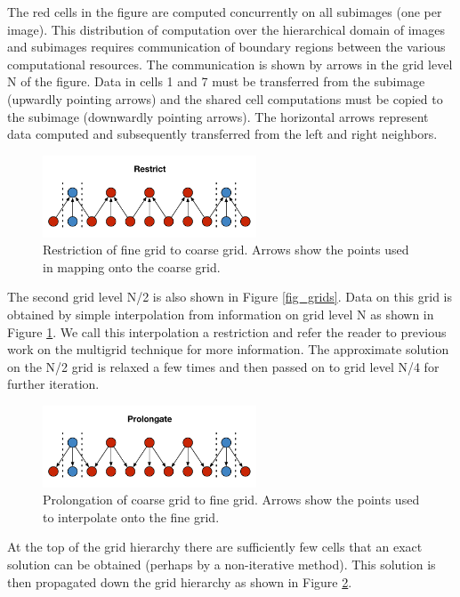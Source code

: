 The red cells in the figure are computed concurrently on all subimages (one per image).
This distribution of computation over the hierarchical domain of images and subimages
requires communication of boundary regions between the various computational resources.
The communication is shown by arrows in the grid level N of the figure.  Data in cells 1
and 7 must be transferred from the subimage (upwardly pointing arrows) and the shared cell
computations must be copied to the subimage (downwardly pointing arrows). The horizontal
arrows represent data computed and subsequently transferred from the left and right
neighbors.

\begin{figure}[!t]
\centering
\includegraphics[width=2.5in]{Fig2}
\caption{Restriction of fine grid to coarse grid. Arrows show the points used in
         mapping onto the coarse grid.}
\label{fig_restric}
\end{figure}

The second grid level N/2 is also shown in Figure \ref{fig_grids}.  Data on this grid is obtained
by simple interpolation from information on grid level N as shown in Figure \ref{fig_restric}.
We call this interpolation a restriction and refer the reader to previous work on the multigrid
technique for more information\cite{multigrid_methods}.  The approximate solution on the N/2
grid is relaxed a few times and then passed on to grid level N/4 for further iteration.

\begin{figure}[!t]
\centering
\includegraphics[width=2.5in]{Fig3}
\caption{Prolongation of coarse grid to fine grid. Arrows show the points used to
         interpolate onto the fine grid.}
\label{fig_prolongate}
\end{figure}

At the top of the grid hierarchy there are sufficiently few cells that an exact solution can be
obtained (perhaps by a non-iterative method).  This solution is then propagated down the
grid hierarchy as shown in Figure \ref{fig_prolongate}.

